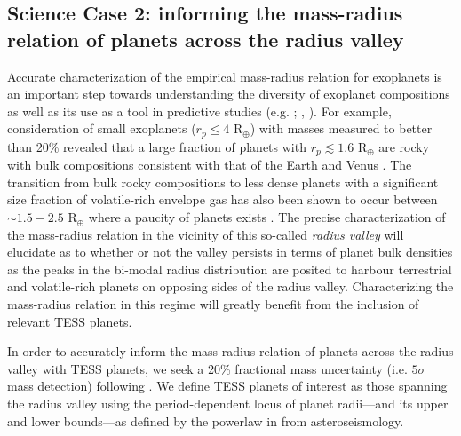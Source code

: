 \subsection{Science Case 2: informing the mass-radius relation of planets across the radius valley} \label{sect:mr}
Accurate characterization of the empirical mass-radius relation for exoplanets
\citep[e.g.][]{weiss13, rogers15, wolfgang16} is an important step towards
understanding the diversity of exoplanet compositions as well as its use as a tool in
predictive studies (e.g. ; \citealt{cloutier17a}, \citealt{cloutier18}).
For example, consideration of small
exoplanets ($r_p \leq 4$ R$_{\oplus}$) with masses measured to better than 20\% revealed that a
large fraction of planets with $r_p \lesssim 1.6$ R$_{\oplus}$ are rocky with bulk compositions
consistent with that of the Earth and Venus \citep{dressing15b}.
The transition from bulk rocky compositions to less dense planets with a significant size fraction of
volatile-rich envelope gas has also been shown to occur
between $\sim 1.5-2.5$ R$_{\oplus}$ where a paucity of planets exists \citep{fulton17, vaneylen18}.
The precise characterization of the mass-radius relation in the vicinity of this so-called
\emph{radius valley} will elucidate as to whether or not the valley persists in terms of planet bulk
densities as the peaks in the bi-modal radius distribution are posited to harbour terrestrial and
volatile-rich planets on opposing sides of the radius valley. Characterizing the mass-radius relation
in this regime will greatly benefit from the inclusion of relevant TESS planets.

In order to accurately inform the mass-radius relation of planets across the radius valley 
with TESS planets, we seek a 20\% fractional mass uncertainty (i.e. $5\sigma$ mass detection) following
\cite{dressing15b}. We define TESS planets
of interest as those spanning the radius valley using the period-dependent locus of planet radii---and
its upper and lower bounds---as defined by the powerlaw in \cite{vaneylen18} from asteroseismology.

